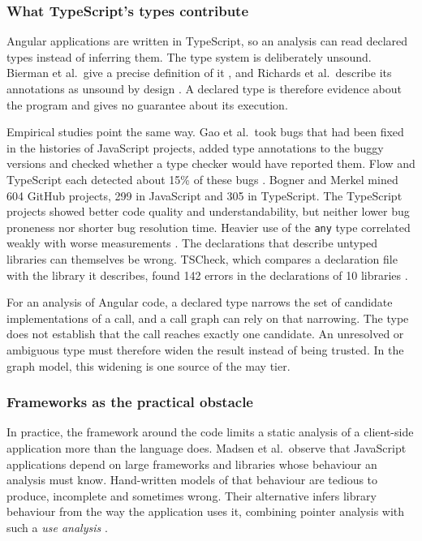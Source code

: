 \subsubsection{What TypeScript's types contribute}

Angular applications are written in TypeScript, so an analysis can read declared types instead
of inferring them. The type system is deliberately unsound. Bierman et al.\ give a precise
definition of it \cite{bierman2014understanding}, and Richards et al.\ describe its annotations
as unsound by design \cite{richards2015concrete}. A declared type is therefore evidence about
the program and gives no guarantee about its execution.

Empirical studies point the same way. Gao et al.\ took bugs that had been fixed in the histories
of JavaScript projects, added type annotations to the buggy versions and checked whether a type
checker would have reported them. Flow and TypeScript each detected about 15\% of these bugs
\cite{gao2017type}. Bogner and Merkel mined 604 GitHub projects, 299 in JavaScript and 305 in
TypeScript. The TypeScript projects showed better code quality and understandability, but neither
lower bug proneness nor shorter bug resolution time. Heavier use of the \texttt{any} type
correlated weakly with worse measurements \cite{bogner2022type}. The declarations that describe
untyped libraries can themselves be wrong. TSCheck, which compares a declaration file with the
library it describes, found 142 errors in the declarations of 10 libraries
\cite{feldthaus2014checking}.

For an analysis of Angular code, a declared type narrows the set of candidate implementations of
a call, and a call graph can rely on that narrowing. The
type does not establish that the call reaches exactly one candidate. An unresolved or ambiguous
type must therefore widen the result instead of being trusted. In the graph model, this widening
is one source of the may tier.

\subsubsection{Frameworks as the practical obstacle}

In practice, the framework around the code limits a static analysis of a client-side application
more than the language does. Madsen et al.\ observe that JavaScript applications depend on large
frameworks and libraries whose behaviour an analysis must know. Hand-written models of that
behaviour are tedious to produce, incomplete and sometimes wrong. Their alternative infers library
behaviour from the way the application uses it, combining pointer analysis with such a \emph{use
analysis} \cite{madsen2013practical}.

